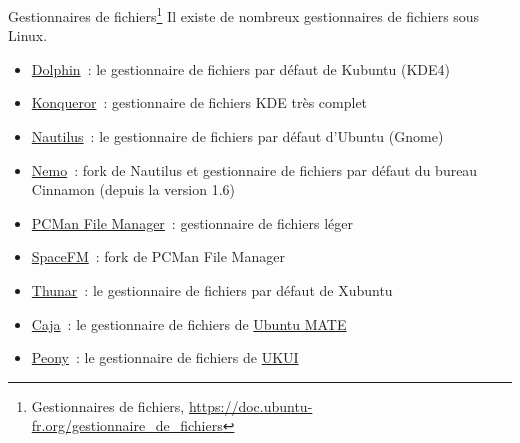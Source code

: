 \documentclass{beamer}
\begin{document}
    \begin{frame}{Gestionnaires de fichiers\footnote{Gestionnaires de fichiers, \url{https://doc.ubuntu-fr.org/gestionnaire_de_fichiers}}}
        Il existe de nombreux gestionnaires de fichiers sous Linux.

        \begin{itemize}
            \item  \href{https://doc.ubuntu-fr.org/dolphin}{Dolphin}~: le gestionnaire de fichiers par défaut de Kubuntu (KDE4)
            \item  \href{https://doc.ubuntu-fr.org/konqueror}{Konqueror}~: gestionnaire de fichiers KDE très complet
            \item  \href{https://doc.ubuntu-fr.org/nautilus}{Nautilus}~: le gestionnaire de fichiers par défaut d'Ubuntu (Gnome)
            \item  \href{https://doc.ubuntu-fr.org/nemo}{Nemo}~: fork de Nautilus et gestionnaire de fichiers par défaut du bureau Cinnamon (depuis la version 1.6)
            \item  \href{https://doc.ubuntu-fr.org/pcmanfm}{PCMan File Manager}~: gestionnaire de fichiers léger
            \item  \href{https://doc.ubuntu-fr.org/spacefm}{SpaceFM}~: fork de PCMan File Manager
            \item  \href{https://doc.ubuntu-fr.org/thunar}{Thunar}~: le gestionnaire de fichiers par défaut de Xubuntu
            \item  \href{https://doc.ubuntu-fr.org/caja}{Caja}~: le gestionnaire de fichiers de \href{https://doc.ubuntu-fr.org/mate}{Ubuntu MATE}
            \item  \href{https://doc.ubuntu-fr.org/peony}{Peony}~: le gestionnaire de fichiers de \href{https://doc.ubuntu-fr.org/ukui}{UKUI}
        \end{itemize}
    \end{frame}
\end{document}
